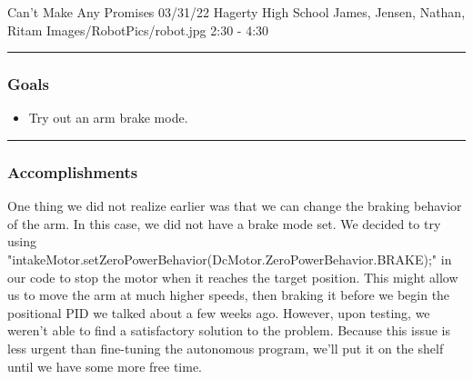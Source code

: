 \insertmeeting 
	{Can't Make Any Promises} 
	{03/31/22} 
	{Hagerty High School}
	{James, Jensen, Nathan, Ritam}
	{Images/RobotPics/robot.jpg}
	{2:30 - 4:30}
	
\noindent\hfil\rule{\textwidth}{.4pt}\hfil
\subsubsection*{Goals}
\begin{itemize}
    \item Try out an arm brake mode.

\end{itemize} 

\noindent\hfil\rule{\textwidth}{.4pt}\hfil

\subsubsection*{Accomplishments}
One thing we did not realize earlier was that we can change the braking behavior of the arm. In this case, we did not have a brake mode set. We decided to try using "intakeMotor.setZeroPowerBehavior(DcMotor.ZeroPowerBehavior.BRAKE);" in our code to stop the motor when it reaches the target position. This might allow us to move the arm at much higher speeds, then braking it before we begin the positional PID we talked about a few weeks ago. However, upon testing, we weren't able to find a satisfactory solution to the problem. Because this issue is less urgent than fine-tuning the autonomous program, we'll put it on the shelf until we have some more free time. 


